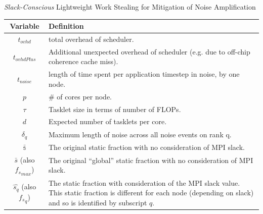 \documentclass[serif,mathserif,final]{beamer}
\begin{document}
\begin{frame}{}
\begin{columns}[t]
\begin{column}{0.27\linewidth}
\begin{block}{\small \textit{Slack-Conscious} Lightweight Work Stealing for Mitigation of Noise Amplification}
\begin{table}
\begin{tabular} {|c|p{24cm}|} \hline
\textbf{\tiny Variable} & \textbf{\tiny Definition} \\ \hline
\tiny $t_{ovhd}$ &  \tiny total overhead of scheduler. \\ \hline
\tiny $t_{ovhdPlus}$ &  \tiny Additional unexpected overhead of scheduler (e.g. due to off-chip coherence cache miss). \\ \hline 
\tiny $t_{noise}$ & \tiny length of time spent per application timestep in noise, by one node.  \\ \hline
\tiny $p$ & \tiny  \# of cores per node. \\ \hline
\tiny ${\tau}$ & \tiny Tasklet size in terms of number of FLOPs. \\ \hline  
\tiny ${d}$ & \tiny Expected number of tasklets per core. \\ \hline 
\tiny ${\delta}_q$ & \tiny Maximum length of noise across all noise events on rank q. \\  \hline 
\tiny $\bar{\mathbb{s}}$ &  \tiny The original static fraction with no consideration of MPI slack. \\  \hline 
\tiny $\bar{s}$ (also ${f_s}_{max}$) & \tiny The original ``global'' static fraction with no consideration of MPI slack. \\ \hline 
\tiny $\hat{s_q}$ (also ${f_s}_{q}$) & \tiny The static fraction with consideration of the MPI slack value. This
static fraction is different for each node (depending on slack) and so is identified by subscript $q$. \\ \hline
\end{tabular}
\end{table} 


\end{block}
\end{column}
\end{columns}
\end{frame}
\end{document}
